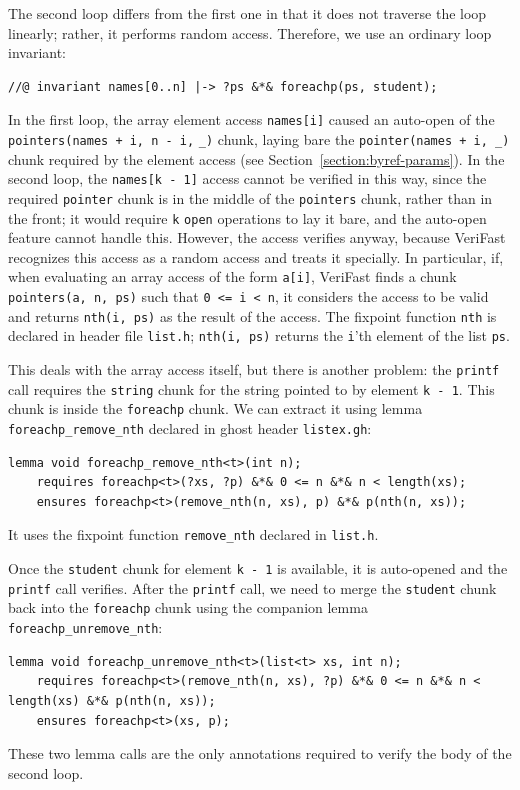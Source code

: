 \documentclass{article}
\begin{document}
The second loop differs from the first one in that it does not
traverse the loop linearly; rather, it performs random access.
Therefore, we use an ordinary loop invariant:
\begin{lstlisting}
//@ invariant names[0..n] |-> ?ps &*& foreachp(ps, student);
\end{lstlisting}
In the first loop, the array element access
\lstinline!names[i]! caused an auto-open of the
\lstinline!pointers(names + i, n - i,! \lstinline!_)! chunk,
laying bare the \lstinline!pointer(names + i, _)! chunk
required by the element access (see
Section~\ref{section:byref-params}). In the second loop, the
\lstinline!names[k - 1]! access cannot be verified in this way,
since the required \lstinline!pointer! chunk is in the middle
of the \lstinline!pointers! chunk, rather than in the front; it
would require \lstinline!k! \lstinline!open! operations to lay
it bare, and the auto-open feature cannot handle this. However,
the access verifies anyway, because VeriFast recognizes this
access as a random access and treats it specially. In
particular, if, when evaluating an array access of the form
\lstinline!a[i]!, VeriFast finds a chunk %
\lstinline!pointers(a, n, ps)! such that %
\lstinline!0 <= i < n!, it considers the access to be valid and
returns \lstinline!nth(i, ps)! as the result of the access. The
fixpoint function \lstinline!nth! is declared in header file
\lstinline!list.h!; \lstinline!nth(i, ps)! returns the
\lstinline!i!'th element of the list \lstinline!ps!.

This deals with the array access itself, but there is another
problem: the \lstinline!printf! call requires the
\lstinline!string! chunk for the string pointed to by element
\lstinline!k - 1!. This chunk is inside the
\lstinline!foreachp! chunk. We can extract it using lemma
\lstinline!foreachp_remove_nth! declared in ghost header
\lstinline!listex.gh!:
\begin{lstlisting}
lemma void foreachp_remove_nth<t>(int n);
    requires foreachp<t>(?xs, ?p) &*& 0 <= n &*& n < length(xs);
    ensures foreachp<t>(remove_nth(n, xs), p) &*& p(nth(n, xs));
\end{lstlisting}
It uses the fixpoint function \lstinline!remove_nth! declared
in \lstinline!list.h!.

Once the \lstinline!student! chunk for element %
\lstinline!k - 1! is available, it is auto-opened and the
\lstinline!printf! call verifies. After the \lstinline!printf!
call, we need to merge the \lstinline!student! chunk back into
the \lstinline!foreachp! chunk using the companion lemma
\lstinline!foreachp_unremove_nth!:
\begin{lstlisting}
lemma void foreachp_unremove_nth<t>(list<t> xs, int n);
    requires foreachp<t>(remove_nth(n, xs), ?p) &*& 0 <= n &*& n < length(xs) &*& p(nth(n, xs));
    ensures foreachp<t>(xs, p);
\end{lstlisting}
These two lemma calls are the only annotations required to
verify the body of the second loop.
\end{document}

